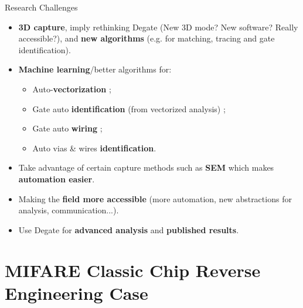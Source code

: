 \documentclass[aspectratio=169]{beamer}
\begin{document}
	
	\begin{frame}{Research Challenges}
		
		\begin{itemize}
			\item \textbf{3D capture}, imply rethinking Degate (New 3D mode? New software? Really accessible?), and \textbf{new algorithms} (e.g. for matching, tracing and gate identification).
			\item \textbf{Machine learning}/better algorithms for:
				\begin{itemize} 
					\item Auto-\textbf{vectorization} ;
					\item Gate auto \textbf{identification} (from vectorized analysis) ;
					\item Gate auto \textbf{wiring} ;
					\item Auto vias \& wires \textbf{identification}.
				\end{itemize}
			\item Take advantage of certain capture methods such as \textbf{SEM} which makes \textbf{automation easier}.
			\item Making the \textbf{field more accessible} (more automation, new abstractions for analysis, communication...).
			\item Use Degate for \textbf{advanced analysis} and \textbf{published results}.
		\end{itemize}

	\end{frame}
	


\section{MIFARE Classic Chip Reverse Engineering Case}
\end{document}
